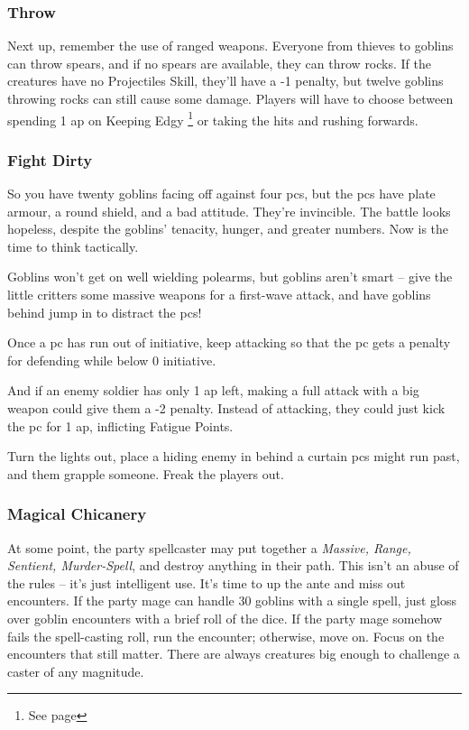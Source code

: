 \begin{multicols}{2}
\subsubsection{Throw}

Next up, remember the use of ranged weapons.
Everyone from thieves to goblins can throw spears, and if no spears are available, they can throw rocks.
If the creatures have no Projectiles Skill, they'll have a -1 penalty, but twelve goblins throwing rocks can still cause some damage.
Players will have to choose between spending 1 \gls{ap} on Keeping Edgy%
\footnote{See page \pageref{edgy}}
 or taking the hits and rushing forwards.

\subsubsection{Fight Dirty}

So you have twenty goblins facing off against four \glspl{pc}, but the \glspl{pc} have plate armour, a round shield, and a bad attitude.
They're invincible.
The battle looks hopeless, despite the goblins' tenacity, hunger, and greater numbers.
Now is the time to think tactically.

Goblins won't get on well wielding polearms, but goblins aren't smart -- give the little critters some massive weapons for a first-wave attack, and have goblins behind jump in to distract the \glspl{pc}!

Once a \gls{pc} has run out of initiative, keep attacking so that the \gls{pc} gets a penalty for defending while below 0 initiative.

And if an enemy soldier has only 1 \gls{ap} left, making a full attack with a big weapon could give them a -2 penalty.
Instead of attacking, they could just kick the \gls{pc} for 1 \gls{ap}, inflicting Fatigue Points.

Turn the lights out, place a hiding enemy in behind a curtain \glspl{pc} might run past, and them grapple someone.
Freak the players out.

\subsubsection{Magical Chicanery}

At some point, the party spellcaster may put together a \textit{Massive, Range, Sentient, Murder-Spell}, and destroy anything in their path.
This isn't an abuse of the rules -- it's just intelligent use.
It's time to up the ante and miss out encounters.
If the party mage can handle 30 goblins with a single spell, just gloss over goblin encounters with a brief roll of the dice.
If the party mage somehow fails the spell-casting roll, run the encounter; otherwise, move on.
Focus on the encounters that still matter.
There are always creatures big enough to challenge a caster of any magnitude.


\end{multicols}
